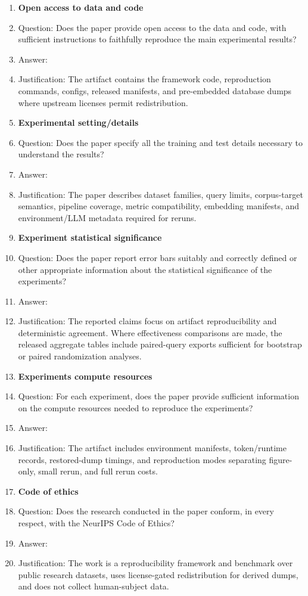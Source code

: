 \begin{enumerate}
\item {\bf Open access to data and code}
\item[] Question: Does the paper provide open access to the data and code, with sufficient instructions to faithfully reproduce the main experimental results?
\item[] Answer: \answerYes{}
\item[] Justification: The artifact contains the framework code, reproduction commands, configs, released manifests, and pre-embedded database dumps where upstream licenses permit redistribution.

\item {\bf Experimental setting/details}
\item[] Question: Does the paper specify all the training and test details necessary to understand the results?
\item[] Answer: \answerYes{}
\item[] Justification: The paper describes dataset families, query limits, corpus-target semantics, pipeline coverage, metric compatibility, embedding manifests, and environment/LLM metadata required for reruns.

\item {\bf Experiment statistical significance}
\item[] Question: Does the paper report error bars suitably and correctly defined or other appropriate information about the statistical significance of the experiments?
\item[] Answer: \answerYes{}
\item[] Justification: The reported claims focus on artifact reproducibility and deterministic agreement. Where effectiveness comparisons are made, the released aggregate tables include paired-query exports sufficient for bootstrap or paired randomization analyses.

\item {\bf Experiments compute resources}
\item[] Question: For each experiment, does the paper provide sufficient information on the compute resources needed to reproduce the experiments?
\item[] Answer: \answerYes{}
\item[] Justification: The artifact includes environment manifests, token/runtime records, restored-dump timings, and reproduction modes separating figure-only, small rerun, and full rerun costs.

\item {\bf Code of ethics}
\item[] Question: Does the research conducted in the paper conform, in every respect, with the NeurIPS Code of Ethics?
\item[] Answer: \answerYes{}
\item[] Justification: The work is a reproducibility framework and benchmark over public research datasets, uses license-gated redistribution for derived dumps, and does not collect human-subject data.


\end{enumerate}
